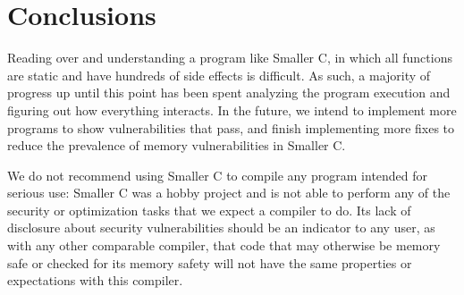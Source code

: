 \documentclass[sigconf, anonymous]{acmart}
\begin{document}
\section{Conclusions}
\label{conclusions}

Reading over and understanding a program like Smaller C, in which all functions are static and have hundreds of side effects is difficult. As such, a majority of progress up until this point has been spent analyzing the program execution and figuring out how everything interacts. In the future, we intend to implement more programs to show vulnerabilities that pass, and finish implementing more fixes to reduce the prevalence of memory vulnerabilities in Smaller C. 

We do not recommend using Smaller C to compile any program intended for serious use: Smaller C was a hobby project and is not able to perform any of the security or optimization tasks that we expect a compiler to do. Its lack of disclosure about security vulnerabilities should be an indicator to any user, as with any other comparable compiler, that code that may otherwise be memory safe or checked for its memory safety will not have the same properties or expectations with this compiler.

\balance
\end{document}
